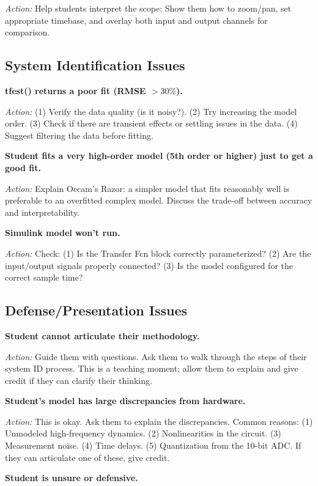 \documentclass[11pt,letterpaper]{article}
\begin{document}
\noindent
\textit{Action:} Help students interpret the scope: Show them how to zoom/pan, set appropriate timebase, and overlay both input and output channels for comparison.

\subsection{System Identification Issues}

\textbf{tfest() returns a poor fit (RMSE $> 30\%$).}

\noindent
\textit{Action:} (1) Verify the data quality (is it noisy?). (2) Try increasing the model order. (3) Check if there are transient effects or settling issues in the data. (4) Suggest filtering the data before fitting.

\textbf{Student fits a very high-order model (5th order or higher) just to get a good fit.}

\noindent
\textit{Action:} Explain Occam's Razor: a simpler model that fits reasonably well is preferable to an overfitted complex model. Discuss the trade-off between accuracy and interpretability.

\textbf{Simulink model won't run.}

\noindent
\textit{Action:} Check: (1) Is the Transfer Fcn block correctly parameterized? (2) Are the input/output signals properly connected? (3) Is the model configured for the correct sample time?

\subsection{Defense/Presentation Issues}

\textbf{Student cannot articulate their methodology.}

\noindent
\textit{Action:} Guide them with questions. Ask them to walk through the steps of their system ID process. This is a teaching moment; allow them to explain and give credit if they can clarify their thinking.

\textbf{Student's model has large discrepancies from hardware.}

\noindent
\textit{Action:} This is okay. Ask them to explain the discrepancies. Common reasons: (1) Unmodeled high-frequency dynamics. (2) Nonlinearities in the circuit. (3) Measurement noise. (4) Time delays. (5) Quantization from the 10-bit ADC. If they can articulate one of these, give credit.

\textbf{Student is unsure or defensive.}
\end{document}

